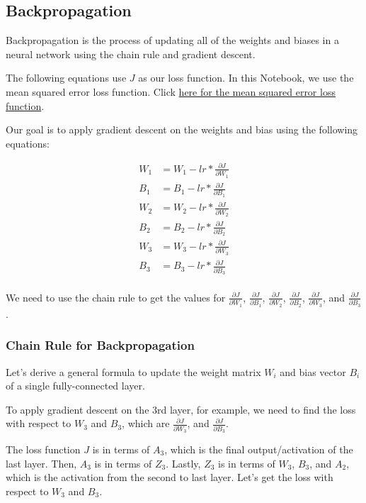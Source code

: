\documentclass[11pt]{article}
\begin{document}
    \subsection{Backpropagation}\label{backpropagation}

Backpropagation is the process of updating all of the weights and biases
in a neural network using the chain rule and gradient descent.

The following equations use \(J\) as our loss function. In this
Notebook, we use the mean squared error loss function. Click
\hyperref[mean-squared-error]{here for the mean squared error loss function}.

Our goal is to apply gradient descent on the weights and bias using the
following equations:

\begin{align*}
W_1 &= W_1 - lr * \frac{\partial J}{\partial W_1} \\
B_1 &= B_1 - lr * \frac{\partial J}{\partial B_1} \\
W_2 &= W_2 - lr * \frac{\partial J}{\partial W_2} \\
B_2 &= B_2 - lr * \frac{\partial J}{\partial B_2} \\
W_3 &= W_3 - lr * \frac{\partial J}{\partial W_3} \\
B_3 &= B_3 - lr * \frac{\partial J}{\partial B_3} \\
\end{align*}

We need to use the chain rule to get the values for
\(\frac{\partial J}{\partial W_1}\),
\(\frac{\partial J}{\partial B_1}\),
\(\frac{\partial J}{\partial W_2}\),
\(\frac{\partial J}{\partial B_2}\),
\(\frac{\partial J}{\partial W_3}\), and
\(\frac{\partial J}{\partial B_3}\).

    \subsubsection{Chain Rule for
Backpropagation}\label{chain-rule-for-backpropagation}

Let's derive a general formula to update the weight matrix \(W_i\) and
bias vector \(B_i\) of a single fully-connected layer.

To apply gradient descent on the 3rd layer, for example, we need to find
the loss with respect to \(W_3\) and \(B_3\), which are
\(\frac{\partial J}{\partial W_3}\), and
\(\frac{\partial J}{\partial B_3}\).

The loss function \(J\) is in terms of \(A_3\), which is the final
output/activation of the last layer. Then, \(A_3\) is in terms of
\(Z_3\). Lastly, \(Z_3\) is in terms of \(W_3\), \(B_3\), and \(A_2\),
which is the activation from the second to last layer. Let's get the
loss with respect to \(W_3\) and \(B_3\).
\end{document}
